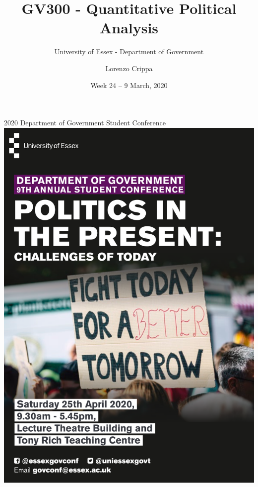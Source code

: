 \documentclass[xcolor=table,dvipsnames]{beamer}
\title{GV300 - Quantitative Political Analysis}
\subtitle{University of Essex - Department of Government}
\date{Week 24 -- 9 March, 2020}				%
\author{Lorenzo Crippa}
\begin{document}
\begin{frame}[plain]
\begin{center}
\titlepage
\end{center}
\end{frame}

\begin{frame}{2020 Department of Government Student Conference}
\centering
\includegraphics[scale=0.35]{pictures/week24_conference.pdf} 
\end{frame}
\end{document}
